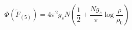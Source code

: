 \begin{equation}
\label{f5}
\Phi({\widetilde{F}}_{(5)}) = 4 \pi^2 g_s N \left( \frac{1}{2} +
\frac{N g_s}{\pi} \log \frac{\rho}{\rho_0}\right)
\end{equation}


